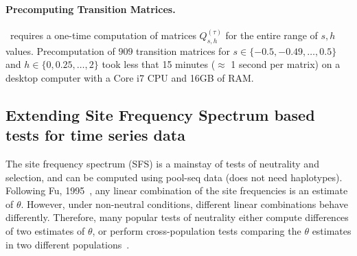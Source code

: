 \paragraph{Precomputing Transition Matrices.}
\comale\ requires a one-time computation of matrices
$Q^{(\tau)}_{s,h}$ for the entire range of $s,h$
values. Precomputation of $909$ transition matrices for
$s\in\{-0.5,-0.49,\ldots,0.5 \}$ and $h\in \{0,0.25,\ldots,2\}$ took
less that 15 minutes ($\approx$ 1 second per matrix) on a desktop
computer with a Core i7 CPU and 16GB of RAM.


\subsection{Extending Site Frequency Spectrum  based tests for  time series 
data}\label{sec:extending-sfs}
\label{sec:sfs-ts}
The site frequency spectrum (SFS) is a mainstay of tests of neutrality
and selection, and can be computed using pool-seq data (does not
need haplotypes). Following Fu, 1995~\cite{fu1995statistical}, any
linear combination of the site frequencies is an estimate of
$\theta$. However, under non-neutral conditions, different linear
combinations behave differently. Therefore, many popular tests of
neutrality either compute differences of two estimates of $\theta$, or
perform cross-population tests comparing the $\theta$ estimates in two
different
populations~\cite{achaz2009frequency,ronen2013learning,sabeti2007genome}. 


